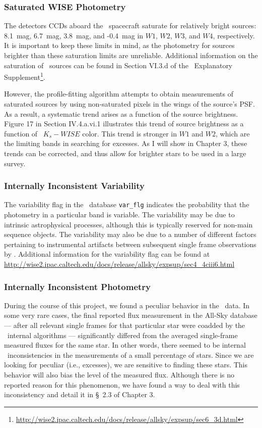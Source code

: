     
        \subsubsection{Saturated WISE Photometry}
    The detectors CCDs aboard the \WS\ spacecraft saturate for relatively bright sources: 8.1~mag, 6.7~mag, 3.8~mag, and -0.4~mag in $W1$, $W2$, $W3$, and $W4$, respectively. It is important to keep these limits in mind, as the photometry for sources brighter than these saturation limits are unreliable. Additional information on the saturation of \WS\ sources can be found in Section VI.3.d of the \WS\ Explanatory Supplement\footnote{\url{http://wise2.ipac.caltech.edu/docs/release/allsky/expsup/sec6_3d.html}}. 
    
    However, the profile-fitting algorithm attempts to obtain measurements of saturated sources by using non-saturated pixels in the wings of the source's PSF. As a result, a systematic trend arises as a function of the source brightness. Figure 17 in Section IV.4.a.vi.1 illustrates this trend of source brightness as a function of \mass\ $K_s-WISE$ color. This trend is stronger in $W1$ and $W2$, which are the limiting bands in searching for excesses. As I will show in Chapter 3, these trends can be corrected, and thus allow for brighter stars to be used in a large survey. 
    
    
        \subsubsection{Internally Inconsistent Variability}
    
    The variability flag in the \WS\ database \verb|var_flg| indicates the probability that the photometry in a particular band is variable. The variability may be due to intrinsic astrophysical processes, although this is typically reserved for non-main sequence objects. The variability may also be due to a number of different factors pertaining to instrumental artifacts between subsequent single frame observations by \WS. Additional information for the variability flag can be found at \url{http://wise2.ipac.caltech.edu/docs/release/allsky/expsup/sec4_4ciii6.html}
    
        \subsubsection{Internally Inconsistent Photometry}
    
    During the course of this project, we found a peculiar behavior in the \WS\ data. In some very rare cases, the final reported flux measurement in the All-Sky database --- after all relevant single frames for that particular star were coadded by the \WS\ internal algorithms --- significantly differed from the averaged single-frame measured fluxes for the same star. In other words, there seemed to be internal \WS\ inconsistencies in the measurements of a small percentage of stars. Since we are looking for peculiar (i.e., excesses), we are sensitive to finding these stars. This behavior will also bias the level of the measured flux. Although there is no reported reason for this phenomenon, we have found a way to deal with this inconsistency and detail it in \S~2.3 of Chapter 3. 
    

